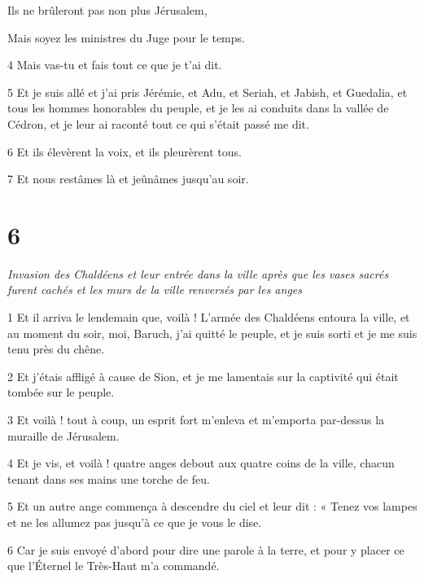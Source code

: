 \par Ils ne brûleront pas non plus Jérusalem,

\par Mais soyez les ministres du Juge pour le temps.

\par 4 Mais vas-tu et fais tout ce que je t'ai dit.


\par 5 Et je suis allé et j'ai pris Jérémie, et Adu, et Seriah, et Jabish, et Guedalia, et tous les hommes honorables du peuple, et je les ai conduits dans la vallée de Cédron, et je leur ai raconté tout ce qui s'était passé me dit.

\par 6 Et ils élevèrent la voix, et ils pleurèrent tous.

\par 7 Et nous restâmes là et jeûnâmes jusqu'au soir.

\chapter{6}

\par \textit{Invasion des Chaldéens et leur entrée dans la ville après que les vases sacrés furent cachés et les murs de la ville renversés par les anges}

\par 1 Et il arriva le lendemain que, voilà ! L'armée des Chaldéens entoura la ville, et au moment du soir, moi, Baruch, j'ai quitté le peuple, et je suis sorti et je me suis tenu près du chêne.

\par 2 Et j'étais affligé à cause de Sion, et je me lamentais sur la captivité qui était tombée sur le peuple.

\par 3 Et voilà ! tout à coup, un esprit fort m'enleva et m'emporta par-dessus la muraille de Jérusalem.

\par 4 Et je vis, et voilà ! quatre anges debout aux quatre coins de la ville, chacun tenant dans ses mains une torche de feu.

\par 5 Et un autre ange commença à descendre du ciel et leur dit : « Tenez vos lampes et ne les allumez pas jusqu'à ce que je vous le dise.

\par 6 Car je suis envoyé d'abord pour dire une parole à la terre, et pour y placer ce que l'Éternel le Très-Haut m'a commandé.

